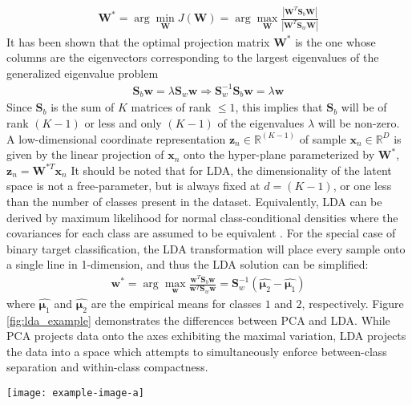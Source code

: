 \begin{align}
	\bm{W}^{*} = \arg\min_{\bm{W}} J(\bm{W}) =  \arg\max_{\bm{W}} \frac{|\bm{W}^{T}\bm{S}_{b}\bm{W}|}{|\bm{W}^{T}\bm{S}_{w}\bm{W}|}
\end{align}
It has been shown that the optimal projection matrix $\bm{W}^{*}$ is the one whose columns are the eigenvectors corresponding to the largest eigenvalues of the generalized eigenvalue problem 
\begin{align}
	\bm{S}_{b}\bm{w}=\lambda \bm{S}_{w}\bm{w} \Rightarrow \bm{S}_{w}^{-1}\bm{S}_{b}\bm{w} = \lambda\bm{w}
\end{align}
Since $\bm{S}_{b}$ is the sum of $K$ matrices of rank $\leq 1$, this implies that $\bm{S}_{b}$ will be of rank $(K-1)$ or less and only $(K-1)$ of the eigenvalues $\lambda$ will be non-zero.  
A low-dimensional coordinate representation $\bm{z}_{n} \in \mathbb{R}^{(K-1)}$ of sample $\bm{x}_{n} \in \mathbb{R}^{D}$ is given by the linear projection of $\bm{x}_{n}$ onto the hyper-plane parameterized by $\bm{W}^{*}$, $\bm{z}_{n} = \bm{W}^{*T}\bm{x}_{n}$  It should be noted that for LDA, the dimensionality of the latent space is not a free-parameter, but is always fixed at $d=(K-1)$, or one less than the number of classes present in the dataset.  Equivalently, LDA can be derived by maximum likelihood for normal class-conditional densities where the covariances for each class are assumed to be equivalent \citep{Murphy2012}.  For the special case of binary target classification, the LDA transformation will place every sample onto a single line in 1-dimension, and thus the LDA solution can be simplified:
\begin{align}
	\bm{w}^{*} = \arg\max_{\bm{w}} \frac{\bm{w}^{T}\bm{S}_{b}\bm{w}}{\bm{w}^{T}\bm{S}_{w}\bm{w}} = \bm{S}_{w}^{-1}(\hat{\bm{\mu}_{2}} - \hat{\bm{\mu}_{1}})
\end{align}  
where $\hat{\bm{\mu}_{1}}$ and $\hat{\bm{\mu}_{2}}$ are the empirical means for classes $1$ and $2$, respectively.  Figure \ref{fig:lda_example} demonstrates the differences between PCA and LDA.  While PCA projects data onto the axes exhibiting the maximal variation, LDA projects the data into a space which attempts to simultaneously enforce between-class separation and within-class compactness. 

\begin{center}
	\begin{figure*}[h]
		\centering
		\texttt{[image: example-image-a]}
		\caption[LDA Example.]{LDA example.}
		\label{fig:lda_example}
	\end{figure*}
\end{center}

